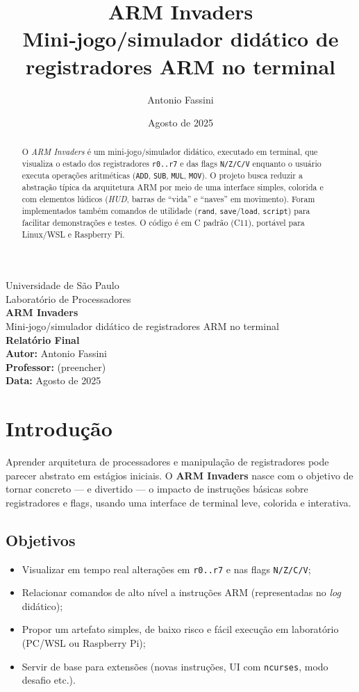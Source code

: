 \documentclass[12pt,a4paper]{article}
\title{\textbf{ARM Invaders} \\ \large Mini‑jogo/simulador didático de registradores ARM no terminal}
\author{Antonio Fassini}
\date{Agosto de 2025}
\begin{document}
\begin{titlepage}
    \centering
    {\Large Universidade de São Paulo}\\[2mm]
    {\large Laboratório de Processadores}\\[18mm]
    {\huge \textbf{ARM Invaders}}\\[3mm]
    {\Large Mini‑jogo/simulador didático de registradores ARM no terminal}\\[18mm]
    {\Large \textbf{Relatório Final}}\\[18mm]
    \textbf{Autor:} Antonio Fassini\\[2mm]
    \textbf{Professor:} (preencher)\\[12mm]
    \textbf{Data:} Agosto de 2025\\[20mm]
    \vfill
\end{titlepage}

\begin{abstract}
O \textit{ARM Invaders} é um mini‑jogo/simulador didático, executado em terminal, que visualiza o estado dos registradores \texttt{r0..r7} e das flags \texttt{N/Z/C/V} enquanto o usuário executa operações aritméticas (\texttt{ADD}, \texttt{SUB}, \texttt{MUL}, \texttt{MOV}). O projeto busca reduzir a abstração típica da arquitetura ARM por meio de uma interface simples, colorida e com elementos lúdicos (\textit{HUD}, barras de ``vida'' e ``naves'' em movimento). Foram implementados também comandos de utilidade (\texttt{rand}, \texttt{save}/\texttt{load}, \texttt{script}) para facilitar demonstrações e testes. O código é em C padrão (C11), portável para Linux/WSL e Raspberry Pi.
\end{abstract}

\tableofcontents
\clearpage
{}

\section{Introdução}
Aprender arquitetura de processadores e manipulação de registradores pode parecer abstrato em estágios iniciais. O \textbf{ARM Invaders} nasce com o objetivo de tornar concreto --- e divertido --- o impacto de instruções básicas sobre registradores e flags, usando uma interface de terminal leve, colorida e interativa.

\subsection{Objetivos}
\begin{itemize}[noitemsep]
  \item Visualizar em tempo real alterações em \texttt{r0..r7} e nas flags \texttt{N/Z/C/V};
  \item Relacionar comandos de alto nível a instruções ARM (representadas no \textit{log} didático);
  \item Propor um artefato simples, de baixo risco e fácil execução em laboratório (PC/WSL ou Raspberry Pi);
  \item Servir de base para extensões (novas instruções, UI com \texttt{ncurses}, modo desafio etc.).
\end{itemize}
\end{document}

